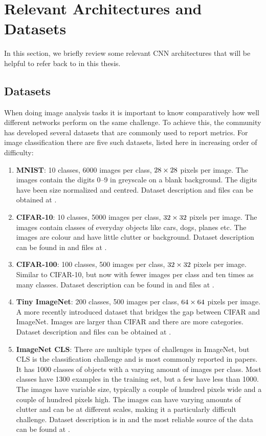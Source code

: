 \section{Relevant Architectures and Datasets}
In this section, we briefly review some relevant CNN architectures that will be
helpful to refer back to in this thesis.

\subsection{Datasets}
When doing image analysis tasks it is important to know comparatively how well
different networks perform on the same challenge. To achieve this, the
community has developed several datasets that are commonly used to report
metrics. For image classification there are five such datasets, listed here in
increasing order of difficulty:
\begin{enumerate}
  \item \textbf{MNIST}: 10 classes, 6000 images per class, $28\times 28$ pixels per image.
    The images contain the digits 0--9 in greyscale on a blank background. The
    digits have been size normalized and centred. Dataset description and files can be obtained
    at \cite{lecun_modified_1998}.
  \item \textbf{CIFAR-10}: 10 classes, 5000 images per class, $32\times 32$ pixels per image.
    The images contain classes of everyday objects like cars, dogs, planes etc.
    The images are colour and have little clutter or background. Dataset
    description can be found in \cite{krizhevsky_learning_2009} and files at
    \cite{krizhevsky_cifar_2009}.
  \item \textbf{CIFAR-100}: 100 classes, 500 images per class, $32\times 32$ pixels per image.
    Similar to CIFAR-10, but now with fewer images per class and ten times as
    many classes. Dataset description can be found in
    \cite{krizhevsky_learning_2009} and files at \cite{krizhevsky_cifar_2009}.
  \item \textbf{Tiny ImageNet}: 200 classes, 500 images per class,
    $64 \times 64$ pixels per image. A more recently introduced dataset that bridges
    the gap between CIFAR and ImageNet. Images are larger than CIFAR and there
    are more categories. Dataset description and files can be obtained at \cite{li_tiny_2017}.
  \item \textbf{ImageNet CLS}: There are multiple types of challenges in ImageNet, but CLS
    is the classification challenge and is most commonly reported in papers.
    It has 1000 classes of objects with a varying amount of images per class.
    Most classes have 1300 examples in the training set, but a few have less
    than 1000. The images have variable size, typically a couple of hundred
    pixels wide and a couple of hundred pixels high. The images can have varying
    amounts of clutter and can be at different scales, making it a particularly
    difficult challenge. Dataset description is in
    \cite{russakovsky_imagenet_2015-1} and the most reliable source of the data
    can be found at \cite{stanford_vision_lab_imagenet_2017}.
\end{enumerate}
